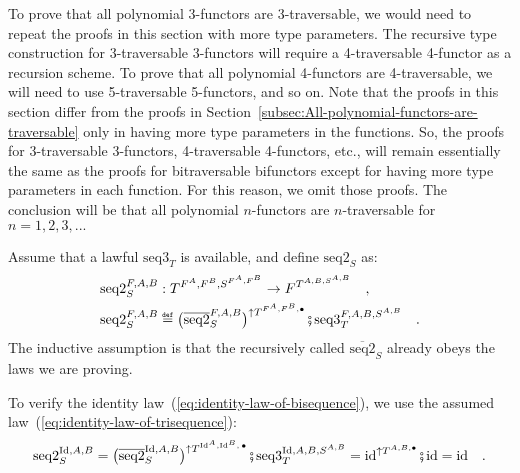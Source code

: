 To prove that all polynomial 3-functors are 3-traversable, we would
need to repeat the proofs in this section with more type parameters.
The recursive type construction for 3-traversable 3-functors will
require a 4-traversable 4-functor as a recursion scheme. To prove
that all polynomial 4-functors are 4-traversable, we will need to
use 5-traversable 5-functors, and so on. Note that the proofs in this
section differ from the proofs in Section~\ref{subsec:All-polynomial-functors-are-traversable}
only in having more type parameters in the functions. So, the proofs
for 3-traversable 3-functors, 4-traversable 4-functors, etc., will
remain essentially the same as the proofs for bitraversable bifunctors
except for having more type parameters in each function. For this
reason, we omit those proofs. The conclusion will be that all polynomial
$n$-functors are $n$-traversable for $n=1,2,3,...$

Assume that a lawful $\text{seq3}_{T}$ is available, and define $\text{seq2}_{S}$
as:
\begin{align*}
 & \text{seq2}_{S}^{F,A,B}:T^{F^{A},F^{B},S^{F^{A},F^{B}}}\rightarrow F^{T^{A,B,S^{A,B}}}\quad,\\
 & \text{seq2}_{S}^{F,A,B}\triangleq\big(\overline{\text{seq2}}_{S}^{F,A,B}\big)^{\uparrow T^{F^{A},F^{B},\bullet}}\bef\text{seq3}_{T}^{F,A,B,S^{A,B}}\quad.
\end{align*}
The inductive assumption is that the recursively called $\overline{\text{seq2}}_{S}$
already obeys the laws we are proving.

To verify the identity law~(\ref{eq:identity-law-of-bisequence}),
we use the assumed law~(\ref{eq:identity-law-of-trisequence}):
\[
\text{seq2}_{S}^{\text{Id},A,B}=\big(\overline{\text{seq2}}_{S}^{\text{Id},A,B}\big)^{\uparrow T^{\text{Id}^{A},\text{Id}^{B},\,\bullet}}\bef\text{seq3}_{T}^{\text{Id},A,B,S^{A,B}}=\text{id}^{\uparrow T^{A,B,\bullet}}\bef\text{id}=\text{id}\quad.
\]

